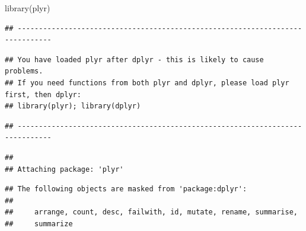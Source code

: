 \documentclass[
]{article}
\newenvironment{Shaded}{\begin{snugshade}}{\end{snugshade}}
\newcommand{\FunctionTok}[1]{\textcolor[rgb]{0.00,0.00,0.00}{#1}}
\newcommand{\NormalTok}[1]{#1}
\begin{document}
\begin{Shaded}
\begin{Highlighting}[]
\FunctionTok{library}\NormalTok{(plyr)}
\end{Highlighting}
\end{Shaded}

\begin{verbatim}
## ------------------------------------------------------------------------------
\end{verbatim}

\begin{verbatim}
## You have loaded plyr after dplyr - this is likely to cause problems.
## If you need functions from both plyr and dplyr, please load plyr first, then dplyr:
## library(plyr); library(dplyr)
\end{verbatim}

\begin{verbatim}
## ------------------------------------------------------------------------------
\end{verbatim}

\begin{verbatim}
## 
## Attaching package: 'plyr'
\end{verbatim}

\begin{verbatim}
## The following objects are masked from 'package:dplyr':
## 
##     arrange, count, desc, failwith, id, mutate, rename, summarise,
##     summarize
\end{verbatim}
\end{document}
